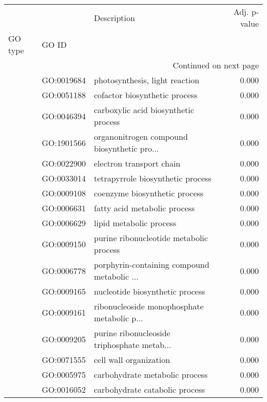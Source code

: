 \begin{longtable}{lllr}
\toprule
   &            &                                  Description &  Adj. p-value \\
GO type & GO ID &                                              &               \\
\midrule
\endhead
\midrule
\multicolumn{4}{r}{{Continued on next page}} \\
\midrule
\endfoot

\bottomrule
\endlastfoot
\multirow{216}{*}{BP} & GO:0019684 &               photosynthesis, light reaction &         0.000 \\
   & GO:0051188 &                cofactor biosynthetic process &         0.000 \\
   & GO:0046394 &         carboxylic acid biosynthetic process &         0.000 \\
   & GO:1901566 &  organonitrogen compound biosynthetic pro... &         0.000 \\
   & GO:0022900 &                     electron transport chain &         0.000 \\
   & GO:0033014 &            tetrapyrrole biosynthetic process &         0.000 \\
   & GO:0009108 &                coenzyme biosynthetic process &         0.000 \\
   & GO:0006631 &                 fatty acid metabolic process &         0.000 \\
   & GO:0006629 &                      lipid metabolic process &         0.000 \\
   & GO:0009150 &      purine ribonucleotide metabolic process &         0.000 \\
   & GO:0006778 &  porphyrin-containing compound metabolic ... &         0.000 \\
   & GO:0009165 &              nucleotide biosynthetic process &         0.000 \\
   & GO:0009161 &  ribonucleoside monophosphate metabolic p... &         0.000 \\
   & GO:0009205 &  purine ribonucleoside triphosphate metab... &         0.000 \\
   & GO:0071555 &                       cell wall organization &         0.000 \\
   & GO:0005975 &               carbohydrate metabolic process &         0.000 \\
   & GO:0016052 &               carbohydrate catabolic process &         0.000 \\

\end{longtable}
